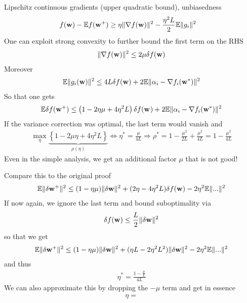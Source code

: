 \documentclass[12pt]{article}
\newcommand{\w}{{\bf w}}
\newcommand{\wstar}{{\bf w^*}}
\newcommand{\E}{\mathbb{E}}
\begin{document}
\maketitle

\noindent Lipschitz continuous gradients (upper quadratic bound), unbiasedness 
\begin{align}
& f(\w) - \E f(\w^{+}) \ge  \eta \| \nabla f(\w) \|^2  - \frac{\eta^2  L }{2}\E  \| g_i\|^2
\end{align}
One can exploit strong convexity to further bound the first term on the RHS
\begin{align}
\| \nabla f(\w) \|^2 \le 2 \mu \delta f(\w) 
\end{align}
Moreover 
\begin{align}
\E \| g_i(\w)\|^2 \leq 4L  \delta f(\w)  + 2 \E \|\alpha_i - \nabla f_i(\wstar)\|^2
\end{align}
So that one gets 
\begin{align}
\E \delta f(\w^{+})  \le \left( 1 - 2 \eta \mu + 4 \eta^2 L \right) \delta f(\w^{}) + 2 \E \|\alpha_i - \nabla f_i(\wstar)\|^2
\end{align}
If the variance correction was optimal, the last term would vanish and 
\begin{align}
\max_\eta \underbrace{\left\{  1-2\mu \eta + 4 \eta^2 L \right\}}_{\rho(\eta)} \iff \eta^* = \frac{ \mu }{4L} 
\Longrightarrow \rho^* =  1 - \frac{\mu^2}{2L} + \frac{\mu^2}{4L} = 1 - \frac{\mu^2}{4L}
\end{align}
Even in the simple analysis, we get an additional factor $\mu$ that is not good!

\noindent Compare this to the original proof 
\begin{align}
  \E \| \delta \w^+ \|^2 \le (1- \eta \mu) \| \delta \w\|^2 + (2\eta - 4\eta^2L) \delta f(\w) - 2 \eta^2 \E\|...\|^2
\end{align}
If now again, we ignore the last term and bound suboptimality via 
\begin{align}
\delta f(\w) \le \frac L2 \| \delta \w\|^2
\end{align}
so that we get 
\begin{align}
  \E \| \delta \w^+ \|^2 \le (1- \eta \mu) \| \delta \w\|^2 + (\eta L - 2\eta^2 L^2) \| \delta \w\|^2 - 2 \eta^2 \E\|...\|^2
\end{align}
and thus 
\begin{align}
\eta^* =  \frac{1-\frac \mu L }{4 L}
\end{align}
We can also approximate this by dropping the $-\mu$ term and get in essence 
\begin{align}
\eta = 
\end{align}
\end{document}
